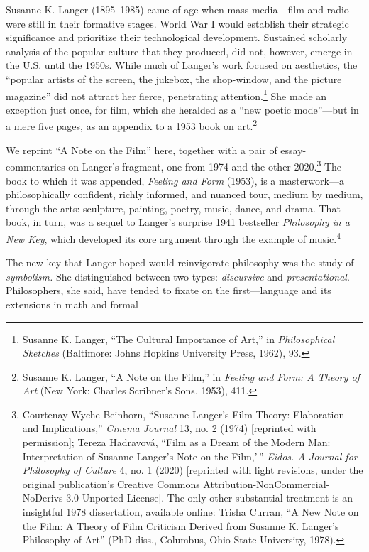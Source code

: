 \documentclass{tufte-handout}
\begin{document}
\begin{titlepage}
 Susanne K. Langer (1895--1985) came of age when
mass media---film and radio---were still in their formative stages.
World War I would establish their strategic significance and prioritize
their technological development. Sustained scholarly analysis of the
popular culture that they produced, did not, however, emerge in the U.S.
until the 1950s. While much of Langer's work focused on aesthetics, the
``popular artists of the screen, the jukebox, the shop-window, and the
picture magazine'' did not attract her fierce, penetrating
attention.\footnote{Susanne K. Langer, ``The Cultural Importance of
  Art,'' in \emph{Philosophical Sketches} (Baltimore: Johns Hopkins
  University Press, 1962), 93.} She made an exception just once, for
film, which she heralded as a ``new poetic mode''---but in a mere five
pages, as an appendix to a 1953 book on art.\footnote{Susanne K. Langer,
  ``A Note on the Film,'' in \emph{Feeling and Form: A Theory of
  Art} (New York: Charles Scribner's Sons, 1953), 411.}

We reprint ``A Note on the Film'' here, together with a pair of
essay-commentaries on Langer's fragment, one from 1974 and the other
2020.\footnote{Courtenay Wyche Beinhorn, ``Susanne Langer's Film Theory:
  Elaboration and Implications,'' \emph{Cinema Journal} 13, no. 2 (1974)
  {[}reprinted with permission{]}; Tereza Hadravová, ``Film as a Dream
  of the Modern Man: Interpretation of Susanne Langer's Note on the
  Film,'\,'' \emph{Eidos. A Journal for Philosophy of Culture} 4, no. 1
  (2020) {[}reprinted with light revisions, under the original
  publication's Creative Commons Attribution-NonCommercial-NoDerivs 3.0
  Unported License{]}. The only other substantial treatment is an
  insightful 1978 dissertation, available online: Trisha Curran, ``A New
  Note on the Film: A Theory of Film Criticism Derived from Susanne K.
  Langer's Philosophy of Art'' (PhD diss., Columbus,
  Ohio State University, 1978).} The book to which it was appended,
\emph{Feeling and Form} (1953), is a masterwork---a philosophically
confident, richly informed, and nuanced tour, medium by medium, through
the arts: sculpture, painting, poetry, music, dance, and drama. That
book, in turn, was a sequel to Langer's surprise 1941 bestseller
\emph{Philosophy in a New Key}, which developed its core argument
through the example of music.\textsuperscript{4}

The new key that Langer hoped would reinvigorate philosophy was the
study of \emph{symbolism.} She distinguished between two types:
\emph{discursive} and \emph{presentational}. Philosophers, she said,
have tended to fixate on the first---language and its extensions in math
and formal

\enlargethispage{2\baselineskip}

\vspace*{2em}



 \end{titlepage}
\end{document}
